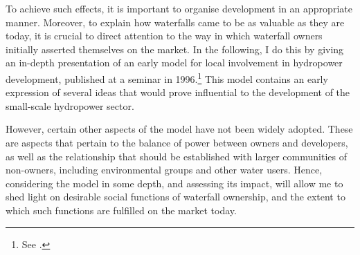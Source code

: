 To achieve such effects, it is important to organise development in an appropriate manner. Moreover, to explain how waterfalls came to be as valuable as they are today, it is crucial to direct attention to the way in which waterfall owners initially asserted themselves on the market. In the following, I do this by giving an in-depth presentation of an early model for local involvement in hydropower development, published at a seminar in 1996.\footnote{See \cite{dyrkolbotn96}.} This model contains an early expression of several ideas that would prove influential to the development of the small-scale hydropower sector.

However, certain other aspects of the model have not been widely adopted. These are aspects that pertain to the balance of power between owners and developers, as well as the relationship that should be established with larger communities of non-owners, including environmental groups and other water users. Hence, considering the model in some depth, and assessing its impact, will allow me to shed light on desirable social functions of waterfall ownership, and the extent to which such functions are fulfilled on the market today.



